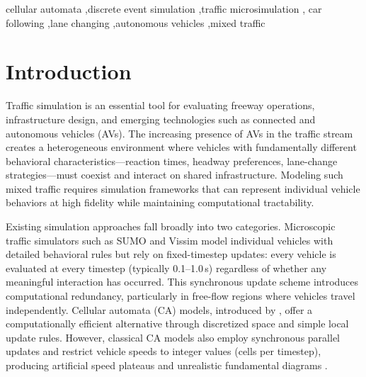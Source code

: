 \documentclass[review,authoryear]{elsarticle}
\begin{document}
\begin{frontmatter}
\begin{abstract}
We derive closed-form expressions linking the resource protocol parameters to macroscopic traffic quantities---capacity, critical density, and backward wave speed---and extend the analysis to mixed AV/HDV traffic. Computational experiments on a four-lane freeway demonstrate that the framework reproduces smooth fundamental diagrams consistent with theory, captures transient congestion dynamics during lane-closure incidents, and models mixed autonomous and human-driven vehicle populations. Increasing AV penetration from 0\% to 70\% yields a 30\% throughput improvement, driven entirely by the reduced headway parameter in the resource protocol.
\end{abstract}

\begin{keyword}
cellular automata \sep discrete event simulation \sep traffic microsimulation \sep
car following \sep lane changing \sep autonomous vehicles \sep mixed traffic
\end{keyword}

\end{frontmatter}

\section{Introduction}
\label{sec:introduction}

Traffic simulation is an essential tool for evaluating freeway operations, infrastructure design, and emerging technologies such as connected and autonomous vehicles (AVs). The increasing presence of AVs in the traffic stream creates a heterogeneous environment where vehicles with fundamentally different behavioral characteristics---reaction times, headway preferences, lane-change strategies---must coexist and interact on shared infrastructure. Modeling such mixed traffic requires simulation frameworks that can represent individual vehicle behaviors at high fidelity while maintaining computational tractability.

Existing simulation approaches fall broadly into two categories. Microscopic traffic simulators such as SUMO \citep{lopez2018microscopic} and Vissim \citep{fellendorf2010microscopic} model individual vehicles with detailed behavioral rules but rely on fixed-timestep updates: every vehicle is evaluated at every timestep (typically 0.1--1.0\,s) regardless of whether any meaningful interaction has occurred. This synchronous update scheme introduces computational redundancy, particularly in free-flow regions where vehicles travel independently. Cellular automata (CA) models, introduced by \citet{nagel1992cellular}, offer a computationally efficient alternative through discretized space and simple local update rules. However, classical CA models also employ synchronous parallel updates and restrict vehicle speeds to integer values (cells per timestep), producing artificial speed plateaus and unrealistic fundamental diagrams \citep{maerivoet2005cellular}.
\end{document}
